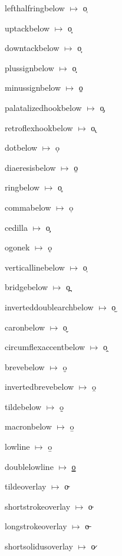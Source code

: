 {\noindent lefthalfringbelow $\mapsto$ {\cdmformat o̜}\par
\noindent uptackbelow $\mapsto$ {\cdmformat o̝}\par
\noindent downtackbelow $\mapsto$ {\cdmformat o̞}\par
\noindent plussignbelow $\mapsto$ {\cdmformat o̟}\par
\noindent minussignbelow $\mapsto$ {\cdmformat o̠}\par
\noindent palatalizedhookbelow $\mapsto$ {\cdmformat o̡}\par
\noindent retroflexhookbelow $\mapsto$ {\cdmformat o̢}\par
\noindent dotbelow $\mapsto$ {\cdmformat ọ}\par
\noindent diaeresisbelow $\mapsto$ {\cdmformat o̤}\par
\noindent ringbelow $\mapsto$ {\cdmformat o̥}\par
\noindent commabelow $\mapsto$ {\cdmformat o̦}\par
\noindent cedilla $\mapsto$ {\cdmformat o̧}\par
\noindent ogonek $\mapsto$ {\cdmformat ǫ}\par
\noindent verticallinebelow $\mapsto$ {\cdmformat o̩}\par
\noindent bridgebelow $\mapsto$ {\cdmformat o̪}\par
\noindent inverteddoublearchbelow $\mapsto$ {\cdmformat o̫}\par
\noindent caronbelow $\mapsto$ {\cdmformat o̬}\par
\noindent circumflexaccentbelow $\mapsto$ {\cdmformat o̭}\par
\noindent brevebelow $\mapsto$ {\cdmformat o̮}\par
\noindent invertedbrevebelow $\mapsto$ {\cdmformat o̯}\par
\noindent tildebelow $\mapsto$ {\cdmformat o̰}\par
\noindent macronbelow $\mapsto$ {\cdmformat o̱}\par
\noindent lowline $\mapsto$ {\cdmformat o̲}\par
\noindent doublelowline $\mapsto$ {\cdmformat o̳}\par
\noindent tildeoverlay $\mapsto$ {\cdmformat o̴}\par
\noindent shortstrokeoverlay $\mapsto$ {\cdmformat o̵}\par
\noindent longstrokeoverlay $\mapsto$ {\cdmformat o̶}\par
\noindent shortsolidusoverlay $\mapsto$ {\cdmformat o̷}\par
}
